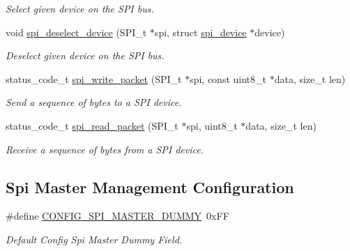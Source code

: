 \begin{DoxyCompactItemize}
\begin{DoxyCompactList}\small\item\em Select given device on the S\-P\-I bus. \end{DoxyCompactList}\item 
void \hyperlink{group__xmega__spi__master__group_gad528d94d606bda0fa6503f77a6a7bb78}{spi\-\_\-deselect\-\_\-device} (S\-P\-I\-\_\-t $\ast$spi, struct \hyperlink{structspi__device}{spi\-\_\-device} $\ast$device)
\begin{DoxyCompactList}\small\item\em Deselect given device on the S\-P\-I bus. \end{DoxyCompactList}\item 
status\-\_\-code\-\_\-t \hyperlink{group__xmega__spi__master__group_ga60595beff80eae31c8dad32a8720865a}{spi\-\_\-write\-\_\-packet} (S\-P\-I\-\_\-t $\ast$spi, const uint8\-\_\-t $\ast$data, size\-\_\-t len)
\begin{DoxyCompactList}\small\item\em Send a sequence of bytes to a S\-P\-I device. \end{DoxyCompactList}\item 
status\-\_\-code\-\_\-t \hyperlink{group__xmega__spi__master__group_ga504ee6688009acff607e0304cc59278d}{spi\-\_\-read\-\_\-packet} (S\-P\-I\-\_\-t $\ast$spi, uint8\-\_\-t $\ast$data, size\-\_\-t len)
\begin{DoxyCompactList}\small\item\em Receive a sequence of bytes from a S\-P\-I device. \end{DoxyCompactList}\end{DoxyCompactItemize}
\subsection*{Spi Master Management Configuration}
\begin{DoxyCompactItemize}
\item 
\hypertarget{group__xmega__spi__master__group_ga64f5ff62d19aab1a97cc5e72e062be49}{\#define \hyperlink{group__xmega__spi__master__group_ga64f5ff62d19aab1a97cc5e72e062be49}{C\-O\-N\-F\-I\-G\-\_\-\-S\-P\-I\-\_\-\-M\-A\-S\-T\-E\-R\-\_\-\-D\-U\-M\-M\-Y}~0x\-F\-F}\label{group__xmega__spi__master__group_ga64f5ff62d19aab1a97cc5e72e062be49}

\begin{DoxyCompactList}\small\item\em Default Config Spi Master Dummy Field. \end{DoxyCompactList}\end{DoxyCompactItemize}


